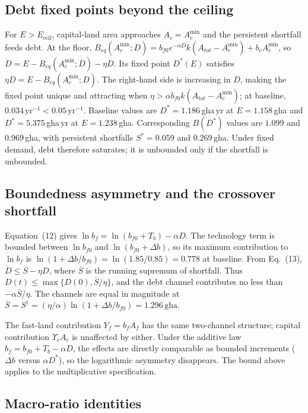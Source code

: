 \documentclass[11pt,a4paper]{article}
\newcommand{\Ups}{\Upsilon_c}
\newcommand{\Eceil}{E_{\mathrm{ceil}}}
\newcommand{\Acmin}{A_c^{\min}}
\begin{document}
\subsection{Debt fixed points beyond the ceiling}\label{si:debt}

For $E>\Eceil$, capital-land area approaches $A_c=\Acmin$ and the persistent shortfall feeds debt. At the floor, $B_{eq}(\Acmin;D)=b_{f0}e^{-\alpha D}k(A_{tot}-\Acmin)+b_c\Acmin$, so $\dot D=E-B_{eq}(\Acmin;D)-\eta D$. Its fixed point $D^*(E)$ satisfies $\eta D=E-B_{eq}(\Acmin;D)$. The right-hand side is increasing in $D$, making the fixed point unique and attracting when $\eta>\alpha b_{f0}k(A_{tot}-\Acmin)$; at baseline, $0.034\,\mathrm{yr}^{-1}<0.05\,\mathrm{yr}^{-1}$. Baseline values are $D^*=1.186$\,gha\,yr at $E=1.158$\,gha and $D^*=5.375$\,gha\,yr at $E=1.238$\,gha. Corresponding $B(D^*)$ values are $1.099$ and $0.969$\,gha, with persistent shortfalls $S^*=0.059$ and $0.269$\,gha. Under fixed demand, debt therefore saturates; it is unbounded only if the shortfall is unbounded.

\subsection{Boundedness asymmetry and the crossover shortfall}\label{si:bounded}

Equation~(12) gives $\ln b_f=\ln(b_{f0}+T_b)-\alpha D$. The technology term is bounded between $\ln b_{f0}$ and $\ln(b_{f0}+\Delta b)$, so its maximum contribution to $\ln b_f$ is $\ln(1+\Delta b/b_{f0})=\ln(1.85/0.85)=0.778$ at baseline. From Eq.~(13), $\dot D\le\bar S-\eta D$, where $\bar S$ is the running supremum of shortfall. Thus $D(t)\le\max\{D(0),\bar S/\eta\}$, and the debt channel contributes no less than $-\alpha\bar S/\eta$. The channels are equal in magnitude at $\bar S=S^\dagger=(\eta/\alpha)\ln(1+\Delta b/b_{f0})=1.296\,\mathrm{gha}$.

The fast-land contribution $Y_f=b_fA_f$ has the same two-channel structure; capital contribution $\Ups A_c$ is unaffected by either. Under the additive law $b_f=b_{f0}+T_b-\alpha D$, the effects are directly comparable as bounded increments ($\Delta b$ versus $\alpha D^*$), so the logarithmic asymmetry disappears. The bound above applies to the multiplicative specification.

\subsection{Macro-ratio identities}\label{si:ratios}
\end{document}
